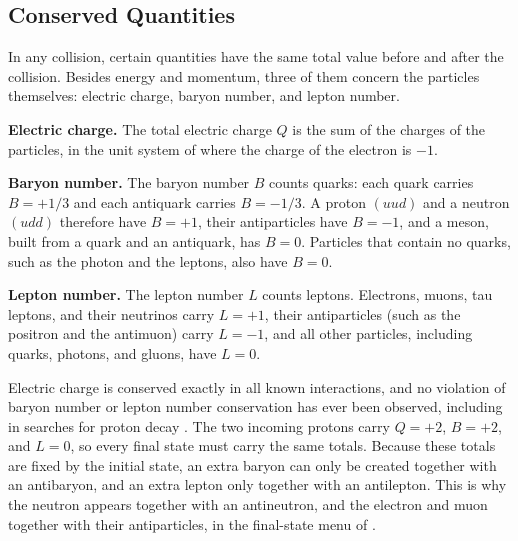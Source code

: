 \documentclass{article}
\begin{document}
\subsection{Conserved Quantities}
\label{ssec:conserved}
In any collision, certain quantities have the same total value before and after the collision. Besides energy and momentum, three of them concern the particles themselves: electric charge, baryon number, and lepton number.

\par\textbf{Electric charge.} The total electric charge $Q$ is the sum of the charges of the particles, in the unit system of  where the charge of the electron is $-1$.

\par\textbf{Baryon number.} The baryon number $B$ counts quarks: each quark carries $B=+1/3$ and each antiquark carries $B=-1/3$. A proton $(uud)$ and a neutron $(udd)$ therefore have $B=+1$, their antiparticles have $B=-1$, and a meson, built from a quark and an antiquark, has $B=0$. Particles that contain no quarks, such as the photon and the leptons, also have $B=0$.

\par\textbf{Lepton number.} The lepton number $L$ counts leptons. Electrons, muons, tau leptons, and their neutrinos carry $L=+1$, their antiparticles (such as the positron and the antimuon) carry $L=-1$, and all other particles, including quarks, photons, and gluons, have $L=0$.

Electric charge is conserved exactly in all known interactions, and no violation of baryon number or lepton number conservation has ever been observed, including in searches for proton decay \cite{pdg2024}. The two incoming protons carry $Q=+2$, $B=+2$, and $L=0$, so every final state must carry the same totals. Because these totals are fixed by the initial state, an extra baryon can only be created together with an antibaryon, and an extra lepton only together with an antilepton. This is why the neutron appears together with an antineutron, and the electron and muon together with their antiparticles, in the final-state menu of .
\end{document}
